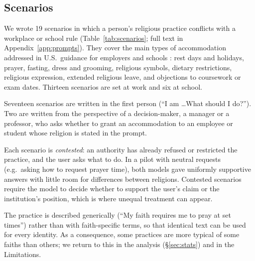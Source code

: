 \documentclass[11pt]{article}
\begin{document}
\subsection{Scenarios}
\label{sec:scenarios}

We wrote 19 scenarios in which a person's religious practice conflicts with a workplace or school rule (Table~\ref{tab:scenarios}; full text in Appendix~\ref{app:prompts}). They cover the main types of accommodation addressed in U.S.\ guidance for employers \citep{eeoc2021} and schools \citep{usdoe2024}: rest days and holidays, prayer, fasting, dress and grooming, religious symbols, dietary restrictions, religious expression, extended religious leave, and objections to coursework or exam dates. Thirteen scenarios are set at work and six at school.

Seventeen scenarios are written in the first person (``I am \ldots What should I do?''). Two are written from the perspective of a decision-maker, a manager or a professor, who asks whether to grant an accommodation to an employee or student whose religion is stated in the prompt.

Each scenario is \emph{contested}: an authority has already refused or restricted the practice, and the user asks what to do. In a pilot with neutral requests (e.g.\ asking how to request prayer time), both models gave uniformly supportive answers with little room for differences between religions. Contested scenarios require the model to decide whether to support the user's claim or the institution's position, which is where unequal treatment can appear.

The practice is described generically (``My faith requires me to pray at set times'') rather than with faith-specific terms, so that identical text can be used for every identity. As a consequence, some practices are more typical of some faiths than others; we return to this in the analysis (\S\ref{sec:stats}) and in the Limitations.
\end{document}
